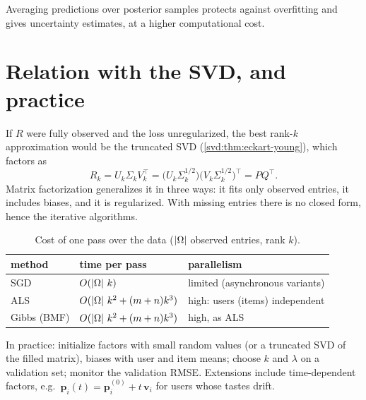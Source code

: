 \begin{notechapter}
Averaging predictions over posterior samples protects against overfitting and gives uncertainty
estimates, at a higher computational cost.

\section{Relation with the SVD, and practice}\label{matrix-factorization:sec:practice}

If $R$ were fully observed and the loss unregularized, the best rank-$k$ approximation would be the
truncated SVD (\cref{svd:thm:eckart-young}), which factors as
\[
  R_k = U_k\Sigma_kV_k^\top = \bigl(U_k\Sigma_k^{1/2}\bigr)\bigl(V_k\Sigma_k^{1/2}\bigr)^\top = PQ^\top .
\]
Matrix factorization generalizes it in three ways: it fits only observed entries, it includes
biases, and it is regularized. With missing entries there is no closed form, hence the iterative
algorithms.

\begin{table}[ht]
\centering
\caption{Cost of one pass over the data ($\left|\Omega\right|$ observed entries, rank $k$).}
\label{matrix-factorization:tab:cost}
\begin{tabular}{@{}lll@{}}
\toprule
method & time per pass & parallelism \\
\midrule
SGD & $O(\left|\Omega\right|\,k)$ & limited (asynchronous variants) \\
ALS & $O(\left|\Omega\right|\,k^2 + (m+n)k^3)$ & high: users (items) independent \\
Gibbs (BMF) & $O(\left|\Omega\right|\,k^2 + (m+n)k^3)$ & high, as ALS \\
\bottomrule
\end{tabular}
\end{table}

In practice: initialize factors with small random values (or a truncated SVD of the filled
matrix), biases with user and item means; choose $k$ and $\lambda$ on a validation set; monitor the
validation RMSE. Extensions include time-dependent factors, e.g.\
$\mathbf p_i(t) = \mathbf p_i^{(0)} + t\,\mathbf v_i$ for users whose tastes drift.


\end{notechapter}
